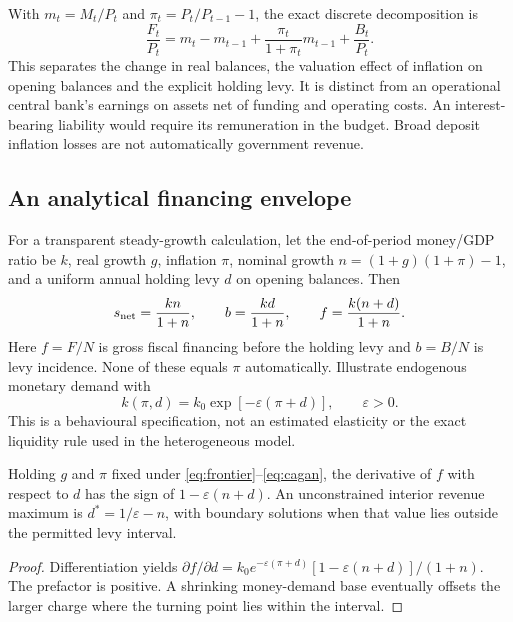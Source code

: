With $m_t=M_t/P_t$ and $\pi_t=P_t/P_{t-1}-1$, the exact discrete decomposition is
\begin{equation}
\frac{F_t}{P_t}=m_t-m_{t-1}+\frac{\pi_t}{1+\pi_t}m_{t-1}+\frac{B_t}{P_t}.\label{eq:seign}
\end{equation}
This separates the change in real balances, the valuation effect of inflation on opening balances and the explicit holding levy. It is distinct from an operational central bank's earnings on assets net of funding and operating costs. An interest-bearing liability would require its remuneration in the budget. Broad deposit inflation losses are not automatically government revenue.

\subsection{An analytical financing envelope}
For a transparent steady-growth calculation, let the end-of-period money/GDP ratio be $k$, real growth $g$, inflation $\pi$, nominal growth $n=(1+g)(1+\pi)-1$, and a uniform annual holding levy $d$ on opening balances. Then
\begin{equation}
s_{\rm net}=\frac{k n}{1+n},\qquad b=\frac{k d}{1+n},\qquad f=\frac{k(n+d)}{1+n}.\label{eq:frontier}
\end{equation}
Here $f=F/N$ is gross fiscal financing before the holding levy and $b=B/N$ is levy incidence. None of these equals $\pi$ automatically. Illustrate endogenous monetary demand with
\begin{equation}
k(\pi,d)=k_0\exp[-\varepsilon(\pi+d)],\qquad \varepsilon>0.\label{eq:cagan}
\end{equation}
This is a behavioural specification, not an estimated elasticity or the exact liquidity rule used in the heterogeneous model.

\begin{proposition}
Holding $g$ and $\pi$ fixed under \eqref{eq:frontier}--\eqref{eq:cagan}, the derivative of $f$ with respect to $d$ has the sign of $1-\varepsilon(n+d)$. An unconstrained interior revenue maximum is $d^*=1/\varepsilon-n$, with boundary solutions when that value lies outside the permitted levy interval.
\end{proposition}
\begin{proof}
Differentiation yields $\partial f/\partial d=k_0e^{-\varepsilon(\pi+d)}[1-\varepsilon(n+d)]/(1+n)$. The prefactor is positive. A shrinking money-demand base eventually offsets the larger charge where the turning point lies within the interval.
\end{proof}

